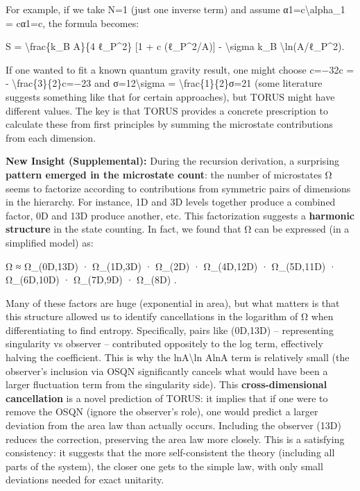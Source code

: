 \documentclass[]{article}
\begin{document}
For example, if we take N=1 (just one inverse term) and assume
α1=c\textbackslash{}alpha\_1 = cα1​=c, the formula becomes:

S = \textbackslash{}frac\{k\_B A\}\{4 ℓ\_P\^{}2\} {[}1 + c
(ℓ\_P\^{}2/A){]} - \textbackslash{}sigma k\_B
\textbackslash{}ln(A/ℓ\_P\^{}2).

If one wanted to fit a known quantum gravity result, one might choose
c=−32c = - \textbackslash{}frac\{3\}\{2\}c=−23​ and
σ=12\textbackslash{}sigma = \textbackslash{}frac\{1\}\{2\}σ=21​ (some
literature suggests something like that for certain approaches), but
TORUS might have different values. The key is that TORUS provides a
concrete prescription to calculate these from first principles by
summing the microstate contributions from each dimension.

\textbf{New Insight (Supplemental):} During the recursion derivation, a
surprising \textbf{pattern emerged in the microstate count}: the number
of microstates Ω seems to factorize according to contributions from
symmetric pairs of dimensions in the hierarchy. For instance, 1D and 3D
levels together produce a combined factor, 0D and 13D produce another,
etc. This factorization suggests a \textbf{harmonic structure} in the
state counting. In fact, we found that Ω can be expressed (in a
simplified model) as:

Ω ≈ Ω\_(0D,13D) · Ω\_(1D,3D) · Ω\_(2D) · Ω\_(4D,12D) · Ω\_(5D,11D) ·
Ω\_(6D,10D) · Ω\_(7D,9D) · Ω\_(8D) .

Many of these factors are huge (exponential in area), but what matters
is that this structure allowed us to identify cancellations in the
logarithm of Ω when differentiating to find entropy. Specifically, pairs
like (0D,13D) -- representing singularity vs observer -- contributed
oppositely to the log term, effectively halving the coefficient. This is
why the ln⁡A\textbackslash{}ln AlnA term is relatively small (the
observer's inclusion via OSQN significantly cancels what would have been
a larger fluctuation term from the singularity side). This
\textbf{cross-dimensional cancellation} is a novel prediction of TORUS:
it implies that if one were to remove the OSQN (ignore the observer's
role), one would predict a larger deviation from the area law than
actually occurs. Including the observer (13D) reduces the correction,
preserving the area law more closely. This is a satisfying consistency:
it suggests that the more self-consistent the theory (including all
parts of the system), the closer one gets to the simple law, with only
small deviations needed for exact unitarity.
\end{document}
